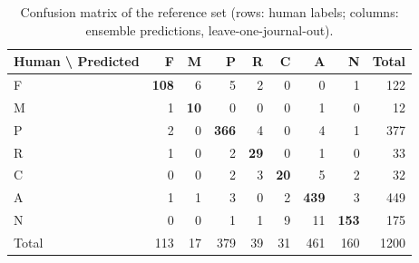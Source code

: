 \begin{table}[htbp]
\centering
\caption{Confusion matrix of the reference set (rows: human labels; columns: ensemble predictions, leave-one-journal-out).}
\label{tab:confusion_matrix_lojo}
\small
\begin{tabular}{l|rrrrrrr|r}
\toprule
Human \textbackslash{} Predicted & F & M & P & R & C & A & N & Total \\
\midrule
F & \textbf{108} & 6 & 5 & 2 & 0 & 0 & 1 & 122 \\
M & 1 & \textbf{10} & 0 & 0 & 0 & 1 & 0 & 12 \\
P & 2 & 0 & \textbf{366} & 4 & 0 & 4 & 1 & 377 \\
R & 1 & 0 & 2 & \textbf{29} & 0 & 1 & 0 & 33 \\
C & 0 & 0 & 2 & 3 & \textbf{20} & 5 & 2 & 32 \\
A & 1 & 1 & 3 & 0 & 2 & \textbf{439} & 3 & 449 \\
N & 0 & 0 & 1 & 1 & 9 & 11 & \textbf{153} & 175 \\
\midrule
Total & 113 & 17 & 379 & 39 & 31 & 461 & 160 & 1200 \\
\bottomrule
\end{tabular}
\end{table}
